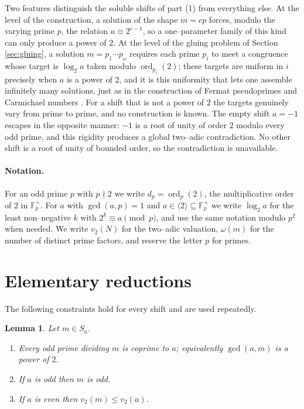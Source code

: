 \documentclass[11pt,reqno]{amsart}
\theoremstyle{plain}
\newtheorem{lemma}{Lemma}
\theoremstyle{definition}
\theoremstyle{remark}
\newcommand{\F}{\mathbb{F}}
\newcommand{\ord}{\operatorname{ord}}
\newcommand{\Sa}{S_a}
\begin{document}
Two features distinguish the soluble shifts of part (1) from everything else. At the level of the construction, a solution of the shape $m=cp$ forces, modulo the varying prime $p$, the relation $a\equiv 2^{c-1}$, so a one--parameter family of this kind can only produce a power of $2$. At the level of the gluing problem of Section \ref{sec:gluing}, a solution $m=p_1\cdots p_\omega$ requires each prime $p_i$ to meet a congruence whose target is $\log_2 a$ taken modulo $\ord_{p_i}(2)$; these targets are uniform in $i$ precisely when $a$ is a power of $2$, and it is this uniformity that lets one assemble infinitely many solutions, just as in the construction of Fermat pseudoprimes and Carmichael numbers \cite{cipolla,agp}. For a shift that is not a power of $2$ the targets genuinely vary from prime to prime, and no construction is known. The empty shift $a=-1$ escapes in the opposite manner: $-1$ is a root of unity of order $2$ modulo every odd prime, and this rigidity produces a global two--adic contradiction. No other shift is a root of unity of bounded order, so the contradiction is unavailable.

\paragraph{Notation.} For an odd prime $p$ with $p\nmid2$ we write $d_p=\ord_p(2)$, the multiplicative order of $2$ in $\F_p^{\times}$. For $a$ with $\gcd(a,p)=1$ and $a\in\langle2\rangle\subseteq\F_p^{\times}$ we write $\log_2a$ for the least non--negative $k$ with $2^{k}\equiv a\pmod p$, and use the same notation modulo $p^{2}$ when needed. We write $v_2(N)$ for the two--adic valuation, $\omega(m)$ for the number of distinct prime factors, and reserve the letter $p$ for primes.

\section{Elementary reductions}\label{sec:reductions}

The following constraints hold for every shift and are used repeatedly.

\begin{lemma}\label{lem:parity}
Let $m\in\Sa$.
\begin{enumerate}
\item Every odd prime dividing $m$ is coprime to $a$; equivalently $\gcd(a,m)$ is a power of $2$.
\item If $a$ is odd then $m$ is odd.
\item If $a$ is even then $v_2(m)\le v_2(a)$.
\end{enumerate}
\end{lemma}
\end{document}
